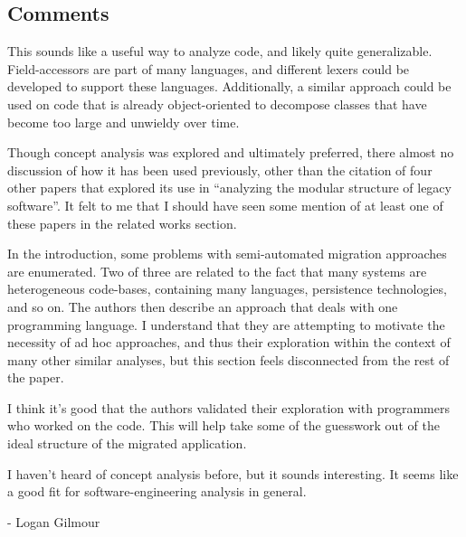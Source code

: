 \documentclass{article}
\begin{document}
\subsection*{Comments}

This sounds like a useful way to analyze code, and likely quite generalizable. Field-accessors are part of many languages, and different lexers could be developed to support these languages. Additionally, a similar approach could be used on code that is already object-oriented to decompose classes that have become too large and unwieldy over time.

Though concept analysis was explored and ultimately preferred, there almost no discussion of how it has been used previously, other than the citation of four other papers that explored its use in ``analyzing the modular structure of legacy software''. It felt to me that I should have seen some mention of at least one of these papers in the related works section.

In the introduction, some problems with semi-automated migration approaches are enumerated. Two of three are related to the fact that many systems are heterogeneous code-bases, containing many languages, persistence technologies, and so on. The authors then describe an approach that deals with one programming language. I understand that they are attempting to motivate the necessity of ad hoc approaches, and thus their exploration within the context of many other similar analyses, but this section feels disconnected from the rest of the paper.

I think it's good that the authors validated their exploration with programmers who worked on the code. This will help take some of the guesswork out of the ideal structure of the migrated application.

I haven't heard of concept analysis before, but it sounds interesting. It seems like a good fit for software-engineering analysis in general.

\vspace{\baselineskip}
 
- Logan Gilmour
\end{document}
